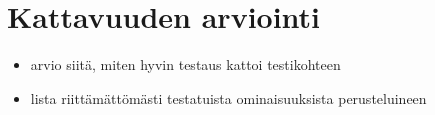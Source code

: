 \section{Kattavuuden arviointi}

\begin{itemize}
	\item arvio siitä, miten hyvin testaus kattoi testikohteen
	\item lista riittämättömästi testatuista ominaisuuksista perusteluineen
\end{itemize}